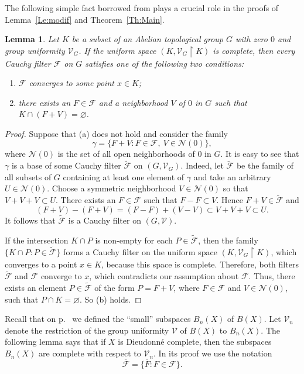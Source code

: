 \documentclass[a4paper,12pt]{amsart}
\def\sub{\subset}
\def\emp{\varnothing}
\def\res{\restriction}
\let\mathcal\mathscr
\newtheorem{lemma}[theorem]{Lemma}
\theoremstyle{definition}
\begin{document}
The following simple fact borrowed from \cite[Lemma~7.9.3]{AT} 
plays a crucial role in the proofs of Lemma~\ref{Le:modif} and 
Theorem~\ref{Th:Main}.

\begin{lemma}\label{Le:add1}
Let $K$ be a subset of an Abelian topological group $G$ with zero $0$
and group uniformity $\mathcal{V}_G$. If the uniform 
space $(K,\mathcal{V}_G\res K)$ is complete, then every
Cauchy filter $\mathscr F$ on $G$ satisfies one of the
following two conditions:
\begin{enumerate}
\item[\textup{(a)}] 
$\mathscr F$ converges to some point $x\in K$;
\item[\textup{(b)}] 
there exists an $F\in\mathscr F$ and a neighborhood $V$
of $0$ in $G$ such that $K\cap (F+V)=\emp$.
\end{enumerate}
\end{lemma}

\begin{proof}
Suppose that (a) does not hold and consider the family
\[
\gamma=\{F+V: F\in\mathscr F,\ V\in\mathcal{N}(0)\},
\]
where $\mathcal{N}(0)$ is the set of all open neighborhoods of $0$ in $G$. It 
is easy to see that $\gamma$ is a base of some Cauchy filter 
$\widetilde{\mathscr F}$ on $(G,\mathcal{V}_G)$. Indeed, let 
$\widetilde{\mathscr F}$ be the family of all subsets of $G$ containing at 
least one element of $\gamma$ and take an arbitrary $U\in\mathcal{N}(0)$. 
Choose a symmetric neighborhood $V\in\mathcal{N}(0)$ so that $V+V+V\sub U$. 
There exists an $F\in\mathscr F$ such that $F-F\sub V$. Hence 
$F+V\in\widetilde{\mathscr F}$ and 
$$
(F+V)-(F+V)=(F-F)+(V-V)\sub V+V+V\sub U. 
$$ 
It follows that $\widetilde{\mathscr F}$ is a Cauchy filter on 
$(G,\mathcal{V})$.

If the intersection $K\cap P$ is non-empty for each $P\in\widetilde{\mathscr 
F}$, then the family $\{K\cap P: P\in\widetilde{\mathscr F}\}$ forms a Cauchy 
filter on the uniform space $(K,\mathcal{V}_G\res K)$, which converges to a 
point $x\in K$, because this space is complete. Therefore, both filters 
$\widetilde{\mathscr F}$ and $\mathscr F$ converge to $x$, which contradicts 
our assumption about $\mathscr F$. Thus, there exists an element 
$P\in\widetilde{\mathscr F}$ of the form $P=F+V$, where $F\in\mathscr F$ 
and $V\in\mathcal{N}(0)$, such that $P\cap K=\emp$. So (b) holds. 
\end{proof}


Recall that on p.~\pageref{B_n(X)} we defined the ``small'' subspaces 
$B_n(X)$ of $B(X)$. Let $\mathscr V_n$ denote the restriction of the 
group uniformity $\mathscr V$ of $B(X)$ to $B_n(X)$. The following lemma says 
that if $X$ is Dieudonn\'e complete, then the subspaces $B_n(X)$ are complete 
with respect to $\mathscr V_n$. In its proof we use the notation 
$$ 
\overline{\mathscr F}= \{\overline F: F\in \mathscr F\}. 
$$ 
\end{document}
